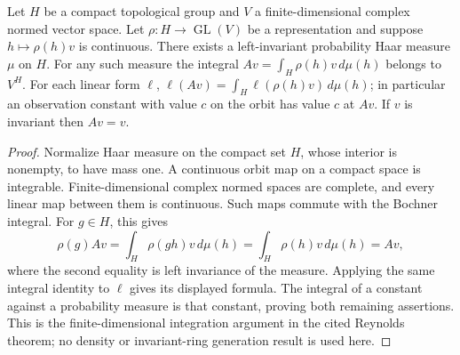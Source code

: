 \begin{lemma}
\label{lem:balanced-compact-vector-average}
\leanok
{}
Let $H$ be a compact topological group and $V$ a finite-dimensional
complex normed vector space. Let $\rho:H\to\operatorname{GL}(V)$ be
a representation and suppose $h\mapsto\rho(h)v$ is continuous.
There exists a left-invariant probability Haar measure $\mu$ on $H$.
For any such measure the integral
$Av=\int_H\rho(h)v\,d\mu(h)$ belongs to $V^H$.
For each linear form $\ell$,
$\ell(Av)=\int_H\ell(\rho(h)v)\,d\mu(h)$; in particular an
observation constant with value $c$ on the orbit has value $c$ at $Av$.
If $v$ is invariant then $Av=v$.
\end{lemma}
\begin{proof}
Normalize Haar measure on the compact set $H$, whose interior is nonempty,
to have mass one. A continuous orbit map on a compact space is integrable.
Finite-dimensional complex normed spaces are complete, and every linear
map between them is continuous. Such maps commute with the Bochner
integral. For $g\in H$, this gives
\[
 \rho(g)Av=\int_H\rho(gh)v\,d\mu(h)
          =\int_H\rho(h)v\,d\mu(h)=Av,
\]
where the second equality is left invariance of the measure.
Applying the same integral identity to $\ell$ gives its displayed
formula. The integral of a constant against a probability measure
is that constant, proving both remaining assertions. This is the
finite-dimensional integration argument in the cited Reynolds theorem;
no density or invariant-ring generation result is used here.
\end{proof}

